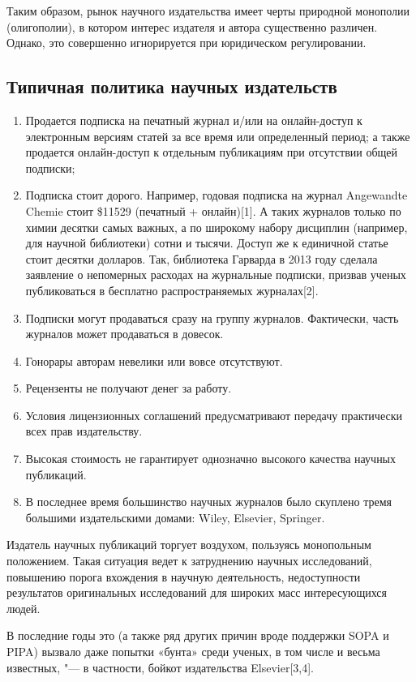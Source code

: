 \documentclass[10pt, a5paper]{article}
\begin{document}
Таким образом, рынок научного издательства имеет черты природной монополии (олигополии), в котором интерес издателя и автора существенно различен. Однако, это совершенно игнорируется при юридическом регулировании.

\subsection*{Типичная политика научных издательств}

\begin{enumerate}
  \item Продается подписка на печатный журнал и/или на онлайн-доступ к электронным версиям статей за все время или определенный период; а также продается онлайн-доступ к отдельным публикациям при отсутствии общей подписки;
  \item Подписка стоит дорого. Например, годовая подписка на журнал Angewandte Chemie стоит \$11529 (печатный + онлайн)[1]. А таких журналов только по химии десятки самых важных, а по широкому набору дисциплин (например, для научной библиотеки) сотни и тысячи. Доступ же к единичной статье стоит десятки долларов. Так, библиотека Гарварда в 2013 году сделала заявление о непомерных расходах на журнальные подписки, призвав ученых публиковаться в бесплатно распространяемых журналах[2].
  \item Подписки могут продаваться сразу на группу журналов. Фактически, часть журналов может продаваться в довесок.
  \item Гонорары авторам невелики или вовсе отсутствуют.
  \item Рецензенты не получают денег за работу.
  \item Условия лицензионных соглашений предусматривают передачу практически всех прав издательству.
  \item Высокая стоимость не гарантирует однозначно высокого качества научных публикаций.
  \item В последнее время большинство научных журналов было скуплено тремя большими издательскими домами: Wiley, Elsevier, Springer.
\end{enumerate}

Издатель научных публикаций торгует воздухом, пользуясь монопольным положением. Такая ситуация ведет к затруднению научных исследований, повышению порога вхождения в научную деятельность, недоступности результатов оригинальных исследований для широких масс интересующихся людей.

В последние годы это (а также ряд других причин вроде поддержки SOPA и PIPA) вызвало даже попытки «бунта» среди ученых, в том числе и весьма известных, "--- в частности, бойкот издательства Elsevier[3,4].
\end{document}
